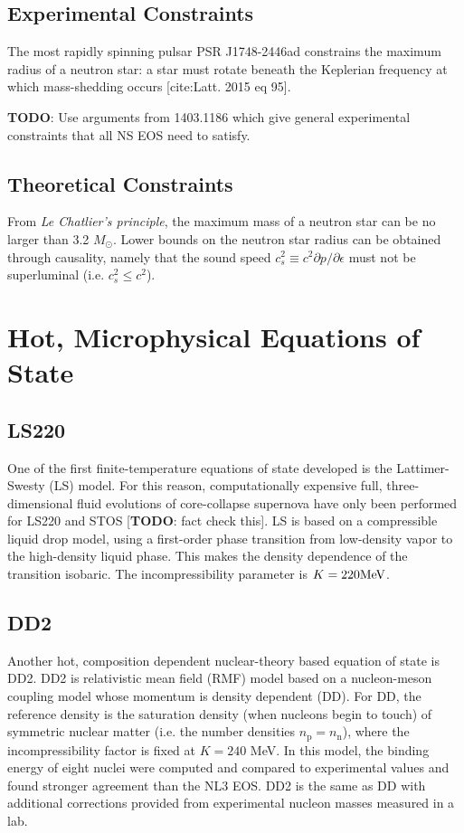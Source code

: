 \subsection{Experimental Constraints}

The most rapidly spinning pulsar PSR J1748-2446ad constrains the maximum radius of a neutron star: a star must rotate beneath the Keplerian frequency at which mass-shedding occurs [cite:Latt. 2015 eq 95].

\textbf{TODO}: Use arguments from 1403.1186 which give general experimental constraints that all NS EOS need to satisfy. 

\subsection{Theoretical Constraints}

From \textit{Le Chatlier's principle}, the maximum mass of a neutron star can be no larger than 3.2 $M_\odot$.  Lower bounds on the neutron star radius can be obtained through causality, namely that the sound speed $c_s^2 \equiv c^2 \partial p / \partial \epsilon$ must not be superluminal (i.e. $c_s^2 \le c^2$).  

\section{Hot, Microphysical Equations of State}
\label{sec:nuclear-eos}

\subsection{LS220}
\label{sec:ls220}

One of the first finite-temperature equations of state developed is the Lattimer-Swesty (LS) model.  For this reason, computationally expensive full, three-dimensional fluid evolutions of core-collapse supernova have only been performed for LS220 and STOS [\textbf{TODO}: fact check this].
LS is based on a compressible liquid drop model, using a first-order phase transition from low-density vapor to the high-density liquid phase.  This makes the density dependence of the transition isobaric.  The incompressibility parameter is $K = 220 {\rm MeV}$.

\subsection{DD2}
\label{sec:dd2}

Another hot, composition dependent nuclear-theory based equation of state is DD2.  DD2 is relativistic mean field (RMF) model based on a nucleon-meson coupling model whose momentum is density dependent (DD).  
For DD, the reference density is the saturation density (when nucleons begin to touch) of symmetric nuclear matter (i.e. the number densities $n_\textrm{p} = n_\textrm{n}$), where the incompressibility factor is fixed at $K = 240$ MeV.
In this model, the binding energy of eight nuclei were computed and compared to experimental values and found stronger agreement than the NL3 EOS.
DD2 is the same as DD with additional corrections provided from experimental nucleon masses measured in a lab.

